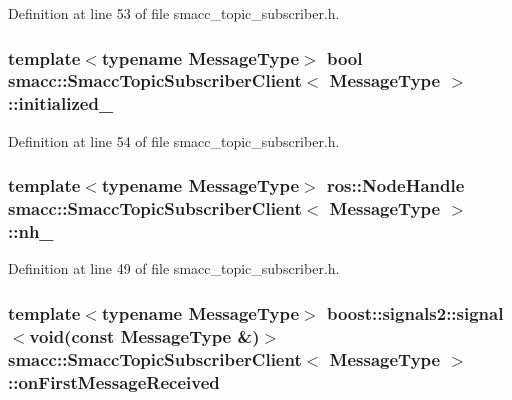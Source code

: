 Definition at line 53 of file smacc\+\_\+topic\+\_\+subscriber.\+h.

\subsubsection[{\texorpdfstring{initialized\+\_\+}{initialized_}}]{\setlength{\rightskip}{0pt plus 5cm}template$<$typename Message\+Type$>$ {\bf bool} {\bf smacc\+::\+Smacc\+Topic\+Subscriber\+Client}$<$ Message\+Type $>$\+::initialized\+\_\+\hspace{0.3cm}{\ttfamily [private]}}\hypertarget{classsmacc_1_1SmaccTopicSubscriberClient_a12a2a96e0b93757b7eb8631da7cd6893}{}\label{classsmacc_1_1SmaccTopicSubscriberClient_a12a2a96e0b93757b7eb8631da7cd6893}


Definition at line 54 of file smacc\+\_\+topic\+\_\+subscriber.\+h.

\subsubsection[{\texorpdfstring{nh\+\_\+}{nh_}}]{\setlength{\rightskip}{0pt plus 5cm}template$<$typename Message\+Type$>$ ros\+::\+Node\+Handle {\bf smacc\+::\+Smacc\+Topic\+Subscriber\+Client}$<$ Message\+Type $>$\+::nh\+\_\+\hspace{0.3cm}{\ttfamily [protected]}}\hypertarget{classsmacc_1_1SmaccTopicSubscriberClient_aed36e84de0628e1a8769be5f87664b59}{}\label{classsmacc_1_1SmaccTopicSubscriberClient_aed36e84de0628e1a8769be5f87664b59}


Definition at line 49 of file smacc\+\_\+topic\+\_\+subscriber.\+h.

\subsubsection[{\texorpdfstring{on\+First\+Message\+Received}{onFirstMessageReceived}}]{\setlength{\rightskip}{0pt plus 5cm}template$<$typename Message\+Type$>$ boost\+::signals2\+::signal$<$void(const Message\+Type \&)$>$ {\bf smacc\+::\+Smacc\+Topic\+Subscriber\+Client}$<$ Message\+Type $>$\+::on\+First\+Message\+Received}\hypertarget{classsmacc_1_1SmaccTopicSubscriberClient_ac18bfc587bbaad6b150ce4bf9cdb56ed}{}\label{classsmacc_1_1SmaccTopicSubscriberClient_ac18bfc587bbaad6b150ce4bf9cdb56ed}


